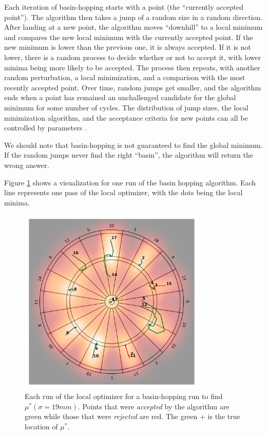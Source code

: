 \documentclass[]{article}
\newcommand{\mustar}{\ensuremath{\mu^* }}
\begin{document}
Each iteration of basin-hopping starts with a point (the ``currently accepted point''). The algorithm then takes a jump of a random size in a random direction. After landing at  a new point, the algorithm  moves ``downhill'' to a local minimum and compares the new local minimum with the currently accepted point. If the new minimum is lower than the previous one, it is always accepted. If it is not lower, there is a random process to decide whether or not to accept it, with lower minima being more likely to be accepted. The process then repeats, with another random perturbation, a local minimization, and a comparison with the most recently accepted point. Over time, random jumps get smaller, and the algorithm ends when a point has remained an unchallenged candidate for the global minimum for some number of cycles. The distribution of jump sizes, the local minimization algorithm, and the acceptance criteria for new points can all be controlled by parameters \cite{basin}.

We should note that basin-hopping is not guaranteed to find the global minimum. If the random jumps never find the right ``basin'', the algorithm will return the wrong answer. 

Figure \ref{fig:basin} shows a visualization for one run of the basin hopping algorithm. Each line represents one pass of the local optimizer, with the dots being the local minima. 

\begin{figure}[h!]
	\centering
	\includegraphics[width=0.8\textwidth]{../images/sig19basin.png}
	\caption{Each run of the local optimizer for a basin-hopping run to find $\mustar(\sigma=19mm)$.  Points that were \textit{accepted} by the algorithm are green while those that were \textit{rejected} are red. The green + is the true location of \mustar.}
	\label{fig:basin}
\end{figure}
\end{document}
